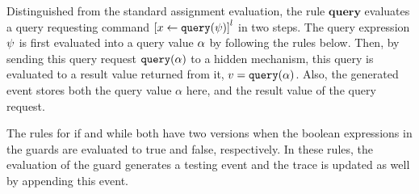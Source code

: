

Distinguished from the standard assignment evaluation, 
the rule $\textbf{query}$ 
evaluates a query requesting command $\clabel{\assign{x}{\query(\qexpr)}}^l$ in two steps.
The query expression $\psi$ is first evaluated into a query value $\alpha$ by following the rules below.
Then, by sending this query request ${\tt query}(\alpha)$ to a hidden mechanism, this query is evaluated to a result value returned from it, $v = {\tt query}(\alpha)$.
Also, the generated event stores both the query value $\alpha$ here, and the result value of the query request.

The rules for if and while both have two versions 
when the boolean expressions in the guards are evaluated to true and false, respectively. 
In these rules, the evaluation of the guard generates a testing event and the trace is updated as well by appending this event.

